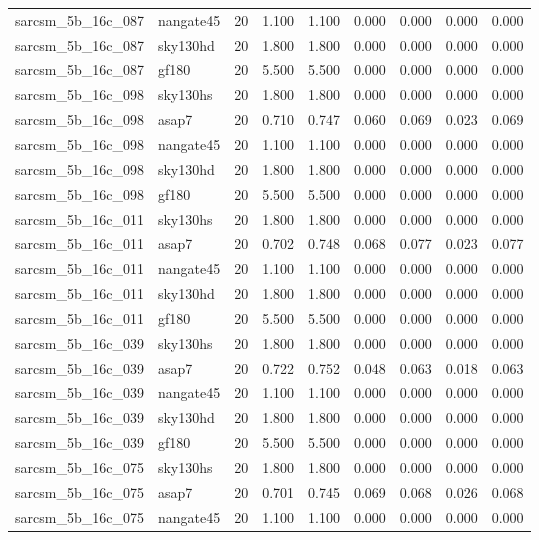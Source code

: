 \begin{tabular}{llrrrrrrr}
sarcsm\_5b\_16c\_087 & nangate45 & 20 & 1.100 & 1.100 & 0.000 & 0.000 & 0.000 & 0.000 \\
sarcsm\_5b\_16c\_087 & sky130hd & 20 & 1.800 & 1.800 & 0.000 & 0.000 & 0.000 & 0.000 \\
sarcsm\_5b\_16c\_087 & gf180 & 20 & 5.500 & 5.500 & 0.000 & 0.000 & 0.000 & 0.000 \\
sarcsm\_5b\_16c\_098 & sky130hs & 20 & 1.800 & 1.800 & 0.000 & 0.000 & 0.000 & 0.000 \\
sarcsm\_5b\_16c\_098 & asap7 & 20 & 0.710 & 0.747 & 0.060 & 0.069 & 0.023 & 0.069 \\
sarcsm\_5b\_16c\_098 & nangate45 & 20 & 1.100 & 1.100 & 0.000 & 0.000 & 0.000 & 0.000 \\
sarcsm\_5b\_16c\_098 & sky130hd & 20 & 1.800 & 1.800 & 0.000 & 0.000 & 0.000 & 0.000 \\
sarcsm\_5b\_16c\_098 & gf180 & 20 & 5.500 & 5.500 & 0.000 & 0.000 & 0.000 & 0.000 \\
sarcsm\_5b\_16c\_011 & sky130hs & 20 & 1.800 & 1.800 & 0.000 & 0.000 & 0.000 & 0.000 \\
sarcsm\_5b\_16c\_011 & asap7 & 20 & 0.702 & 0.748 & 0.068 & 0.077 & 0.023 & 0.077 \\
sarcsm\_5b\_16c\_011 & nangate45 & 20 & 1.100 & 1.100 & 0.000 & 0.000 & 0.000 & 0.000 \\
sarcsm\_5b\_16c\_011 & sky130hd & 20 & 1.800 & 1.800 & 0.000 & 0.000 & 0.000 & 0.000 \\
sarcsm\_5b\_16c\_011 & gf180 & 20 & 5.500 & 5.500 & 0.000 & 0.000 & 0.000 & 0.000 \\
sarcsm\_5b\_16c\_039 & sky130hs & 20 & 1.800 & 1.800 & 0.000 & 0.000 & 0.000 & 0.000 \\
sarcsm\_5b\_16c\_039 & asap7 & 20 & 0.722 & 0.752 & 0.048 & 0.063 & 0.018 & 0.063 \\
sarcsm\_5b\_16c\_039 & nangate45 & 20 & 1.100 & 1.100 & 0.000 & 0.000 & 0.000 & 0.000 \\
sarcsm\_5b\_16c\_039 & sky130hd & 20 & 1.800 & 1.800 & 0.000 & 0.000 & 0.000 & 0.000 \\
sarcsm\_5b\_16c\_039 & gf180 & 20 & 5.500 & 5.500 & 0.000 & 0.000 & 0.000 & 0.000 \\
sarcsm\_5b\_16c\_075 & sky130hs & 20 & 1.800 & 1.800 & 0.000 & 0.000 & 0.000 & 0.000 \\
sarcsm\_5b\_16c\_075 & asap7 & 20 & 0.701 & 0.745 & 0.069 & 0.068 & 0.026 & 0.068 \\
sarcsm\_5b\_16c\_075 & nangate45 & 20 & 1.100 & 1.100 & 0.000 & 0.000 & 0.000 & 0.000 \\

\end{tabular}
